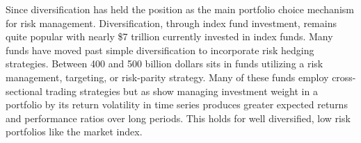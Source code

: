 \noindent %
Since \citet{markowitz_portfolio_1952} diversification has held the position as the main portfolio choice mechanism for risk management. Diversification, through index fund investment, remains quite popular with nearly \$7 trillion currently invested in index funds. \citep{ici_factbook} Many funds have moved past simple diversification to incorporate risk hedging strategies. Between 400 and 500 billion dollars sits in funds utilizing a risk management, targeting, or risk-parity strategy. \citep{cao_risk_2016,verma_volatility-targeting_2018} Many of these funds employ cross-sectional trading strategies but as \citet{moreira_volatility-managed_2017} show %
managing investment weight in a portfolio by its return volatility in time series produces greater expected returns and performance ratios over long periods. This holds for well diversified, low risk portfolios like the market index. 
